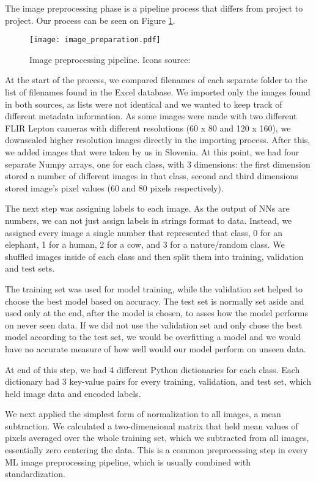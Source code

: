 The image preprocessing phase is a pipeline process that differs from project to project.
Our process can be seen on Figure \ref{image_preparation}.

\begin{figure}[ht]
    \centering
    \texttt{[image: image\_preparation.pdf]} 
    \caption{Image preprocessing pipeline. Icons source:\cite{icons}}
    \label{image_preparation}
\end{figure}

At the start of the process, we compared filenames of each separate folder to the list of filenames found in the Excel database.
We imported only the images found in both sources, as lists were not identical and we wanted to keep track of different metadata information.
As some images were made with two different FLIR Lepton cameras with different resolutions (60 x 80 and 120 x 160), we downscaled higher resolution images directly in the importing process.
After this, we added images that were taken by us in Slovenia.
At this point, we had four separate Numpy arrays, one for each class, with 3 dimensions: the first dimension stored a number of different images in that class, second and third dimensions stored image's pixel values (60 and 80 pixels respectively).

The next step was assigning labels to each image.
As the output of NNs are numbers, we can not just assign labels in strings format to data.
Instead, we assigned every image a single number that represented that class, 0 for an elephant, 1 for a human, 2 for a cow, and 3 for a nature/random class.
We shuffled images inside of each class and then split them into training, validation and test sets.

The training set was used for model training, while the validation set helped to choose the best model based on accuracy.
The test set is normally set aside and used only at the end, after the model is chosen, to asses how the model performs on never seen data.
If we did not use the validation set and only chose the best model according to the test set, we would be overfitting a model and we would have no accurate measure of how well would our model perform on unseen data.

At end of this step, we had 4 different Python dictionaries for each class.
Each dictionary had 3 key-value pairs for every training, validation, and test set, which held image data and encoded labels.

We next applied the simplest form of normalization to all images, a mean subtraction.
We calculated a two-dimensional matrix that held mean values of pixels averaged over the whole training set, which we subtracted from all images, essentially zero centering the data.
This is a common preprocessing step in every ML image preprocessing pipeline, which is usually combined with standardization\footnotemark.

